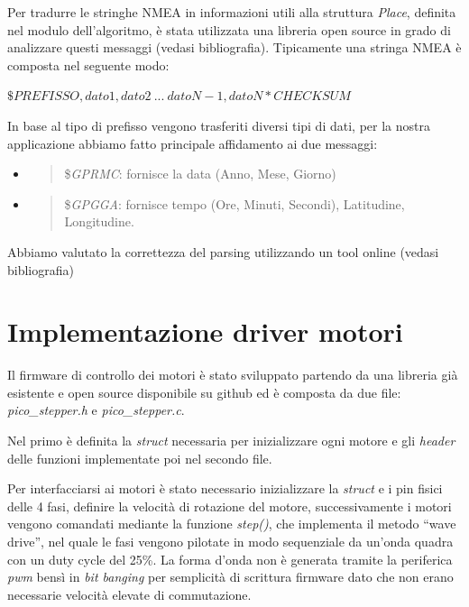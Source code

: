 Per tradurre le stringhe NMEA in informazioni utili alla struttura
\emph{Place}, definita nel modulo dell'algoritmo, è stata utilizzata una
libreria open source in grado di analizzare questi messaggi (vedasi
bibliografia). Tipicamente una stringa NMEA è composta nel seguente
modo:

\(\$ PREFISSO,dato1,dato2\ ...\ datoN - 1,datoN*CHECKSUM\)

In base al tipo di prefisso vengono trasferiti diversi tipi di dati, per
la nostra applicazione abbiamo fatto principale affidamento ai due
messaggi:

\begin{itemize}
\item
  \begin{quote}
  \$\emph{GPRMC}: fornisce la data (Anno, Mese, Giorno)
  \end{quote}
\item
  \begin{quote}
  \$\emph{GPGGA}: fornisce tempo (Ore, Minuti, Secondi), Latitudine,
  Longitudine.
  \end{quote}
\end{itemize}

Abbiamo valutato la correttezza del parsing utilizzando un tool online
(vedasi bibliografia)

\hypertarget{implementazione-driver-motori}{%
\section{Implementazione driver
motori}\label{implementazione-driver-motori}}

Il firmware di controllo dei motori è stato sviluppato partendo da una
libreria già esistente e open source disponibile su github ed è composta
da due file: \emph{pico\_stepper.h} e \emph{pico\_stepper.c}.

Nel primo è definita la \emph{struct} necessaria per inizializzare ogni
motore e gli \emph{header} delle funzioni implementate poi nel secondo
file.

Per interfacciarsi ai motori è stato necessario inizializzare la
\emph{struct} e i pin fisici delle 4 fasi, definire la velocità di
rotazione del motore, successivamente i motori vengono comandati
mediante la funzione \emph{step()}, che implementa il metodo ``wave
drive'', nel quale le fasi vengono pilotate in modo sequenziale da
un'onda quadra con un duty cycle del 25\%. La forma d'onda non è
generata tramite la periferica \emph{pwm} bensì in \emph{bit banging}
per semplicità di scrittura firmware dato che non erano necessarie
velocità elevate di commutazione.

